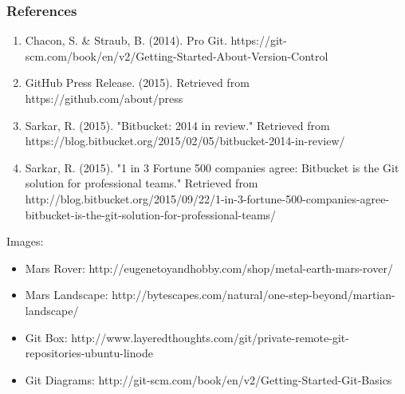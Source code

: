 \begin{frame}
    \centering
    \frametitle{References}
	\fontsize{9}{7.2}
	\begin{enumerate}
		\item Chacon, S. \& Straub, B.  (2014).  Pro Git.  https://git-scm.com/book/en/v2/Getting-Started-About-Version-Control
		\item GitHub Press Release.  (2015).  Retrieved from https://github.com/about/press
		\item Sarkar, R.  (2015).  "Bitbucket: 2014 in review."  Retrieved from https://blog.bitbucket.org/2015/02/05/bitbucket-2014-in-review/
		\item Sarkar, R.  (2015).  "1 in 3 Fortune 500 companies agree: Bitbucket is the Git solution for professional teams."  Retrieved from http://blog.bitbucket.org/2015/09/22/1-in-3-fortune-500-companies-agree-bitbucket-is-the-git-solution-for-professional-teams/
	\end{enumerate}	
	Images:
	\begin{itemize}
		\item Mars Rover: http://eugenetoyandhobby.com/shop/metal-earth-mars-rover/
		\item Mars Landscape: http://bytescapes.com/natural/one-step-beyond/martian-landscape/
		\item Git Box: http://www.layeredthoughts.com/git/private-remote-git-repositories-ubuntu-linode
		\item Git Diagrams: http://git-scm.com/book/en/v2/Getting-Started-Git-Basics
	\end{itemize}
\end{frame}